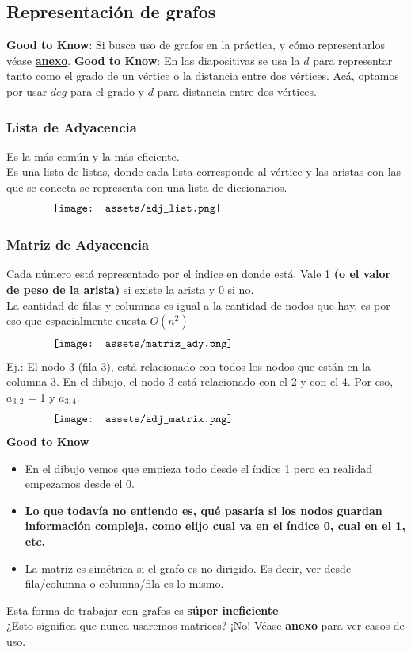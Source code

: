 \documentclass[10pt,a4paper]{article}
\begin{document}
\subsection*{Representación de grafos}
\textbf{Good to Know}: Si busca uso de grafos en la práctica, y cómo representarlos véase \hyperref[subsec:representacion_grafos_practica]{\textbf{anexo}}.
\textbf{Good to Know}: En las diapositivas se usa la $d$ para representar tanto como el grado de un vértice o la distancia entre dos vértices. Acá, optamos por usar $deg$ para el grado y $d$ para distancia entre dos vértices.
\subsubsection*{Lista de Adyacencia}
Es la más común y la más eficiente. \\
Es una lista de listas, donde cada lista corresponde al vértice y las aristas con las que se conecta se representa con una lista de diccionarios. 
\[\begin{minipage}[b]{0.8\textwidth}
    \texttt{[image: assets/adj\_list.png]}
\end{minipage}\]
\subsubsection*{Matriz de Adyacencia}
Cada número está representado por el índice en donde está. Vale 1 \textbf{(o el valor de peso de la arista)} si existe la arista y 0 si no. \\
La cantidad de filas y columnas es igual a la cantidad de nodos que hay, es por eso que espacialmente cuesta $O(n^{2})$
\[\begin{minipage}[b]{0.8\textwidth}
    \texttt{[image: assets/matriz\_ady.png]}
\end{minipage}\]
Ej.: El nodo 3 (fila 3), está relacionado con todos los nodos que están en la columna 3. En el dibujo, el nodo 3 está relacionado con el 2 y con el 4. Por eso, $a_{3, 2}$ = 1 y $a_{3, 4}$. 
\[\begin{minipage}[b]{0.8\textwidth}
    \texttt{[image: assets/adj\_matrix.png]}
\end{minipage}\]
\textbf{Good to Know}
\begin{itemize}
    \item En el dibujo vemos que empieza todo desde el índice 1 pero en realidad empezamos desde el 0. 
    \item \textbf{Lo que todavía no entiendo es, qué pasaría si los nodos guardan información compleja, como elijo cual va en el índice 0, cual en el 1, etc.} 
    \item La matriz es simétrica si el grafo es no dirigido. Es decir, ver desde fila/columna o columna/fila es lo mismo. 
\end{itemize}
Esta forma de trabajar con grafos es \textbf{súper ineficiente}. \\
¿Esto significa que nunca usaremos matrices? ¡No! Véase \hyperref[subsec:representacion_grafos_practica]{\textbf{anexo}} para ver casos de uso.
\end{document}
